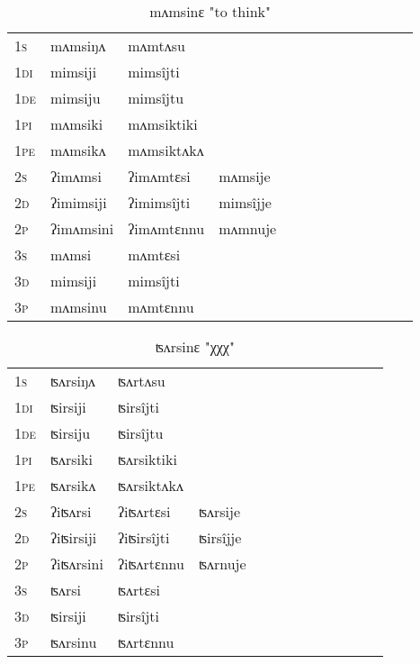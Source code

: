 \documentclass[oldfontcommands,oneside,a4paper,11pt]{article}
\begin{document}
\begin{table}[H]
\label{im.vr} \centering 
\caption{mʌmsinɛ  "to think"  }
\begin{tabular}{l|l|l|l|l|l|l|l|l|l|l|l|l}  \toprule
\textsc{1s} &mʌmsiŋʌ &mʌmtʌsu \\ 
\textsc{1di} &mimsiji &mimsîjti   \\
\textsc{1de} &mimsiju &mimsîjtu   \\ 
\textsc{1pi} &mʌmsiki &mʌmsiktiki   \\ 
\textsc{1pe} &mʌmsikʌ &mʌmsiktʌkʌ   \\ 
\textsc{2s} & ʔimʌmsi & ʔimʌmtɛsi &mʌmsije  \\ 
\textsc{2d} & ʔimimsiji & ʔimimsîjti &mimsîjje    \\
\textsc{2p} & ʔimʌmsini  & ʔimʌmtɛnnu &mʌmnuje  \\ 
\textsc{3s} & mʌmsi & mʌmtɛsi   \\ 
\textsc{3d} & mimsiji & mimsîjti   \\ 
\textsc{3p} & mʌmsinu  & mʌmtɛnnu \\ 
\bottomrule
\end{tabular}
\end{table}


\begin{table}[H]
\label{ir.vr} \centering 
\caption{ʦʌrsinɛ  "χχχ"  }
\begin{tabular}{l|l|l|l|l|l|l|l|l|l|l|l|l}  \toprule
\textsc{1s} &ʦʌrsiŋʌ &ʦʌrtʌsu \\ 
\textsc{1di} &ʦirsiji &ʦirsîjti   \\
\textsc{1de} &ʦirsiju &ʦirsîjtu   \\ 
\textsc{1pi} &ʦʌrsiki &ʦʌrsiktiki   \\ 
\textsc{1pe} &ʦʌrsikʌ &ʦʌrsiktʌkʌ   \\ 
\textsc{2s} & ʔiʦʌrsi & ʔiʦʌrtɛsi &ʦʌrsije  \\ 
\textsc{2d} & ʔiʦirsiji & ʔiʦirsîjti &ʦirsîjje    \\
\textsc{2p} & ʔiʦʌrsini  & ʔiʦʌrtɛnnu &ʦʌrnuje  \\ 
\textsc{3s} & ʦʌrsi & ʦʌrtɛsi   \\ 
\textsc{3d} & ʦirsiji & ʦirsîjti   \\ 
\textsc{3p} & ʦʌrsinu  & ʦʌrtɛnnu \\ 
\bottomrule
\end{tabular}
\end{table}
\end{document}
